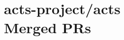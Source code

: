 \providecommand{\prmerged}{MERGED }
\providecommand{\propen}{OPEN }
\providecommand{\prwip}{WIP }
\providecommand{\prstale}{STALE }
\providecommand{\iss}{}
    

\providecommand{\cusemoji}[1]{}
\providecommand{\emojispace}[1]{}

\providecommand{\prstr}[1]{PR\##1}
\providecommand{\issstr}[1]{Issue\##1}








\section{ acts-project/acts \\ Merged PRs}

